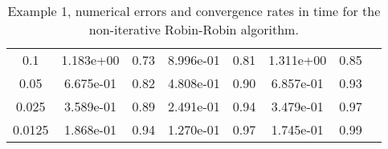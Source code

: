 \documentclass[11pt]{article}
\begin{document}
\begin{table}[htb!]
\begin{tabular}{|c|c|c|c|c|c|c|c|}
		{\small{}0.1} & {\small{} 1.183e+00  } & {\small{}0.73 } & {\small{} 8.996e-01    } & {\small{}0.81 } & {\small{} 1.311e+00    } & {\small{}0.85 } \tabularnewline
		
		{\small{}0.05} & {\small{}   6.675e-01  } & {\small{}0.82 } & {\small{}4.808e-01    } & {\small{} 0.90 } & {\small{} 6.857e-01       } & {\small{}0.93 }  \tabularnewline
		
		{\small{}0.025} & {\small{}3.589e-01    } & {\small{}0.89 } & {\small{}  2.491e-01  } & {\small{}0.94 } & {\small{} 3.479e-01  } & {\small{}0.97 }  \tabularnewline
		
		{\small{}0.0125} & {\small{}  1.868e-01     } & {\small{}0.94 } & {\small{} 1.270e-01    } & {\small{}0.97  } & {\small{}1.745e-01   } & {\small{} 0.99 } \tabularnewline
		\hline
	\end{tabular}
\caption{Example 1, numerical errors and convergence rates in time 
  for the non-iterative Robin-Robin algorithm.} \label{tab:Errors-Convergence rates-1}
\end{table}
\end{document}
